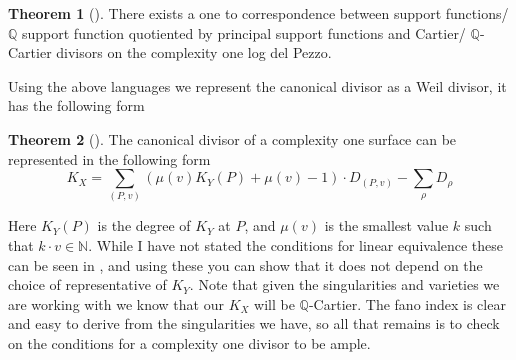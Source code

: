 \documentclass[11pt]{amsart}
\theoremstyle{definition}
\newtheorem{thm}{Theorem}[section]
\theoremstyle{definition}
\theoremstyle{definition}
\theoremstyle{definition}
\theoremstyle{definition}
\theoremstyle{definition}
\theoremstyle{definition}
\begin{document}
\begin{thm}[\cite{PS}]
There exists a one to correspondence between support functions/ $\mathbb{Q}$ support function quotiented by principal support functions and Cartier/ $\mathbb{Q}$-Cartier divisors on the complexity one log del Pezzo.
\end{thm}
Using the above languages we represent the canonical divisor as a Weil divisor, it has the following form
\begin{thm}[\cite{PS}]
The canonical divisor of a complexity one surface can be represented in the following form
\[
K_X = \sum_{(P, v)} ( \mu (v) K_Y (P) + \mu (v) - 1) \cdot D_{(P,v)} - \sum_\rho D_\rho
\]
\end{thm}
Here $K_Y(P)$ is the degree of $K_Y$ at $P$, and $\mu (v)$ is the smallest value $k$ such that $k \cdot v \in \mathbb{N}$.  While I have not stated the conditions for linear equivalence these can be seen in \cite{PS}, and using these you can show that it does not depend on the choice of representative of $K_Y$. Note that given the singularities and varieties we are working with we know that our $K_X$ will be $\mathbb{Q}$-Cartier. The fano index is clear and easy to derive from the singularities we have, so all that remains is to check on the conditions for a complexity one divisor to be ample.
\end{document}
